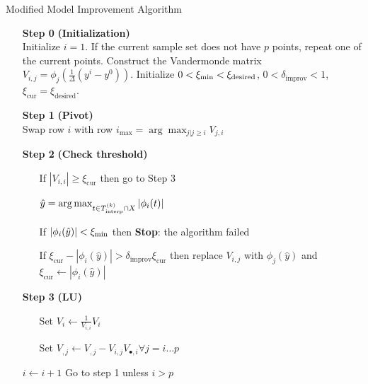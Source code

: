 \begin{algorithm}[H]
    \caption{Modified Model Improvement Algorithm}
    \label{modified_model_improving_algorithm}
    \begin{itemize}
        \item[\textbf{Step 0}] \textbf{(Initialization)} \\
            Initialize $i=1$.
            If the current sample set does not have $p$ points, repeat one of the current points. 
            Construct the Vandermonde matrix $V_{i,j} = \phi_j(\frac 1 {\Delta}(y^i - y^0))$.
            Initialize $0 < \xi_{\text{min}} < \xi_{\text{desired}}$, $0 <\delta_{\text{improv}} < 1$,
            $  \xi_{\text{cur}} = \xi_{\text{desired}}$.
            
        \item[\textbf{Step 1}] \textbf{(Pivot)} \\
            Swap row $i$ with row $i_{\max} = \arg \max_{j|j\ge i} V_{j,i} $
        
        \item[\textbf{Step 2}] \textbf{(Check threshold)} \begin{itemize}
                \item[] If $|V_{i,i}| \ge \xi_{\text{cur}} $ then go to Step 3
                \item[] $ \hat y = \arg\max_{t \in {T_{\text{interp}}^{(k)}} \cap X} |\phi_i(t)|$
                \item[] If $\label{impossibly_poised} |\phi_i(\hat y)| < \xi_{\text{min}}$ then \textbf{Stop}: the algorithm failed
                \item[] If $\xi_{\text{cur}} - |\phi_i(\hat y)| > \delta_{\text{improv}} \xi_{\text{cur}}$ then replace $V_{i,j}$ with $\phi_j(\hat y)$ and $\xi_{\text{cur}} \gets |\phi_i(\hat y)|$
            \end{itemize}
        
        \item[\textbf{Step 3}] \textbf{(LU)} \begin{itemize}
                \item[] Set $V_i \gets \frac{1}{V_{i,i}} V_i$
                \item[] Set $V_{,j} \gets V_{, j} - V_{i,j} V_{\bullet, i} \forall j=i \ldots p$
            \end{itemize}
            $i \gets i+1$
            Go to step 1 unless $i > p$
    \end{itemize}
\end{algorithm}

